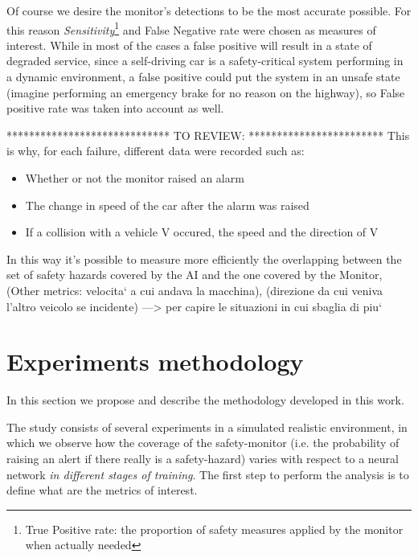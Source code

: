Of course we desire the monitor's detections to be the most accurate possible. For this reason \textsl{Sensitivity}\footnote{True Positive rate: the proportion of safety measures applied by the monitor when actually needed} and False Negative rate were chosen as measures of interest.\newline
While in most of the cases a false positive will result in a state of degraded service, since a self-driving car is a safety-critical system performing in a dynamic environment, a false positive could put the system in an unsafe state (imagine performing an emergency brake for no reason on the highway), so False positive rate was taken into account as well.\newline

*****************************\newline 
TO REVIEW: 
\newline *************************\newline
This is why, for each failure, different data were recorded such as:
\begin{itemize}
	\item Whether or not the monitor raised an alarm
	\item The change in speed of the car after the alarm was raised
	\item If a collision with a vehicle V occured, the speed and the direction of V
\end{itemize}

In this way it's possible to measure more efficiently the overlapping between the set of safety hazards covered by the AI and the one covered by the Monitor,
(Other metrics: velocita` a cui andava la macchina), (direzione da cui veniva l'altro veicolo se incidente)
---> per capire le situazioni in cui sbaglia di piu`


\section{Experiments methodology}

In this section we propose and describe the methodology developed in this work.\newline

The study consists of several experiments in a simulated realistic environment, in which we observe how the coverage of the safety-monitor (i.e. the probability of raising an alert if there really is a safety-hazard) varies with respect to a neural network \textsl{in different stages of training}.\newline
The first step to perform the analysis is to define what are the metrics of interest.

